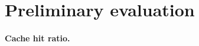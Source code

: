 \section{Preliminary evaluation}
\label{sec:Evaluation}



\vspace{-6pt}
\paragraph{Cache hit ratio.}

